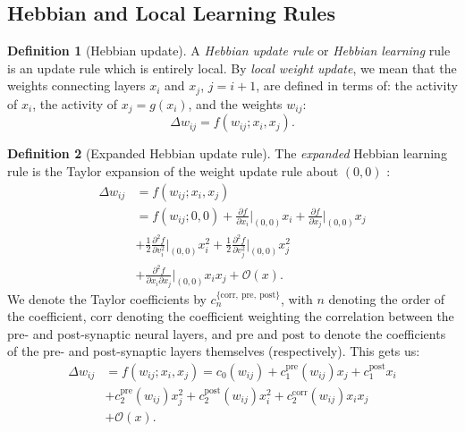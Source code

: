 \documentclass{article}
\theoremstyle{definition}
\newtheorem{definition}{Definition}[subsection]
\begin{document}
\subsection{Hebbian and Local Learning Rules}\label{sec:hebb}

\begin{definition}[Hebbian update]
  A \textit{Hebbian update rule} or \textit{Hebbian learning} rule is an update
  rule which is entirely local. By \textit{local weight update}, we mean that
  the weights connecting layers $x_i$ and $x_j$, $j = i + 1$, are defined
  in terms of: the activity of $x_i$, the activity of $x_j = g(x_i)$, and
  the weights $w_{ij}$:
  \begin{equation}
    \Delta w_{ij} = f (w_{ij}; x_i, x_j).
  \end{equation}
\end{definition}

\begin{definition}[Expanded Hebbian update rule]\label{def:expanded-hebb}
  The \textit{expanded} Hebbian learning rule is the Taylor expansion
  of the weight update rule about $(0, 0)$
  \parencite{gerstner_mathematical_2002}:
  \begin{align*}
    \Delta w_{ij} &= f(w_{ij}; x_i, x_j) \\
    &= f(w_{ij}; 0, 0) + \frac{\partial f}{\partial x_i} \big|_{(0,
    0)} x_i + \frac{\partial f}{\partial x_j}
    \big|_{(0, 0)} x_j \\
    &+ \frac{1}{2} \frac{\partial^2 f}{\partial v^2_i} \big|_{(0, 0)}
    x_i^2 + \frac{1}{2} \frac{\partial^2 f}{\partial v^2_j}\big|_{(0,
    0)} x_j^2 \\
    &+ \frac{\partial^2 f}{\partial x_i \partial x_j}\big|_{(0, 0)}
    x_i x_j + \mathcal{O}(x).
  \end{align*}
  We denote the Taylor coefficients by
  $c_n^{\{\text{corr},~\text{pre},~\text{post}\}}$, with
  $n$ denoting the order of the coefficient, $\text{corr}$ denoting
  the coefficient
  weighting the correlation between the pre- and post-synaptic neural
  layers, and
  $\text{pre}$ and $\text{post}$ to denote the coefficients of the
  pre- and post-synaptic
  layers themselves (respectively).
  This gets us:
  \begin{align*}
    \Delta w_{ij} &= f(w_{ij}; x_i, x_j) =
    c_0 (w_{ij}) + c_1^\text{pre} (w_{ij}) x_j + c_1^\text{post} x_i \\
    &+ c_2^\text{pre} (w_{ij}) x_j^2 + c_2^\text{post} (w_{ij}) x_i^2
    + c_2^\text{corr} (w_{ij}) x_i x_j \\
    &+ \mathcal{O} (x).
  \end{align*}
\end{definition}
\end{document}
